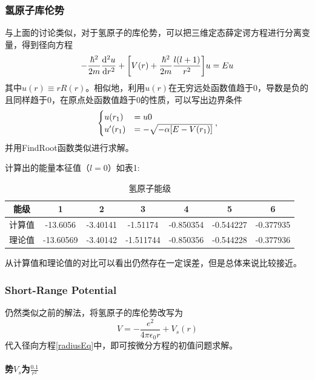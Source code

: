 \documentclass[hyperref,cs4size,titlepage,twoside]{ctexart}
\begin{document}
\subsubsection{氢原子库伦势}
与上面的讨论类似，对于氢原子的库伦势，可以把三维定态薛定谔方程进行分离变量，得到径向方程
\begin{equation}\label{radiusEq}
  -\frac{\hbar^2}{2m}\dv[2]{u}{r}+\bqty{V(r)+\frac{\hbar^2}{2m}\frac{l(l+1)}{r^2}}u=Eu
\end{equation}
其中$u(r)\equiv rR(r)$。相似地，利用$u(r)$在无穷远处函数值趋于0，导数是负的且同样趋于0，在原点处函数值趋于0的性质，可以写出边界条件
\begin{equation*}
\begin{cases}
u(r_1)&=u0\\
u'(r_1)&=-\sqrt{-\alpha\bqty{E-V(r_1)}}
\end{cases}
,
\end{equation*}
并用FindRoot函数类似进行求解。

计算出的能量本征值（$l=0$）如表1:
\begin{table}[!htdp]
  \centering
  \begin{tabular}{|c|c|c|c|c|c|c|}
    \hline
    能级 & 1 & 2 & 3 & 4 & 5 & 6 \\
    \hline
    计算值 & -13.6056 & -3.40141 & -1.51174 & -0.850354 & -0.544227 & -0.377935\\
    \hline
    理论值 & -13.60569 & -3.40142 & -1.511744 & -0.850356 & -0.544228 & -0.377936 \\
    \hline
  \end{tabular}
  \caption{氢原子能级}\label{Hydrogen}
\end{table}
从计算值和理论值的对比可以看出仍然存在一定误差，但是总体来说比较接近。

\subsubsection{Short-Range Potential}
仍然类似之前的解法，将氢原子的库伦势改写为
\begin{equation}\label{Vs}
  V=-\frac{e^2}{4\pi \epsilon_0 r}+V_s(r)
\end{equation}
代入径向方程\eqref{radiusEq}中，即可按微分方程的初值问题求解。
\paragraph{势$V_s$为$\displaystyle\frac{0.1}{r^2}$}
\end{document}
